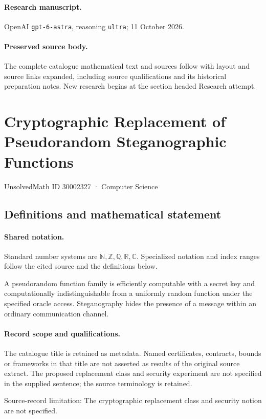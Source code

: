 \documentclass[11pt]{article}
\begin{document}
\paragraph{Research manuscript.} OpenAI \texttt{gpt-6-astra}, reasoning \texttt{ultra}; 11 October 2026.
\paragraph{Preserved source body.} The complete catalogue mathematical text and sources follow with layout and source links expanded, including source qualifications and its historical preparation notes. New research begins at the section headed Research attempt.

\section{Cryptographic Replacement of Pseudorandom Steganographic Functions}\label{30002327}
{\small UnsolvedMath ID 30002327 · Computer Science}
\subsection{Definitions and mathematical statement}

\paragraph{Shared notation.}Standard number systems are $\mathbb N,\mathbb Z,\mathbb Q,\mathbb R,\mathbb C$. Specialized notation and index ranges follow the cited source and the definitions below.


A pseudorandom function family is efficiently computable with a secret key and computationally indistinguishable from a uniformly random function under the specified oracle access. Steganography hides the presence of a message within an ordinary communication channel.
\paragraph{Record scope and qualifications.}
The catalogue title is retained as metadata. Named certificates, contracts, bounds or frameworks in that title are not asserted as results of the original source extract.
The proposed replacement class and security experiment are not specified in the supplied sentence; the source terminology is retained.

Source-record limitation: The cryptographic replacement class and security notion are not specified.
\end{document}
